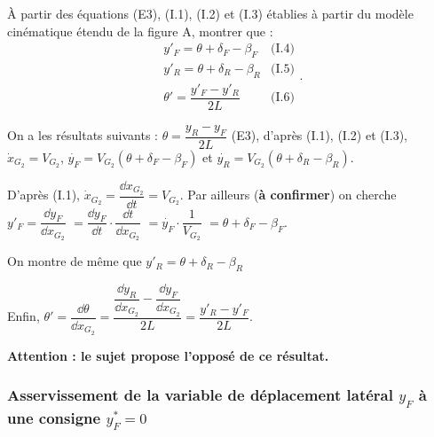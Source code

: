 \documentclass[11pt]{article}
\begin{document}
\UPSTIpreambuleEpreuve	%




\UPSTIquestion À partir des équations (E3), (I.1), (I.2) et (I.3) établies à partir du modèle cinématique étendu de la
figure A, montrer que : 
$$ \begin{array}{lr}
y'_F = \theta + \delta_F-\beta_F   & \text{(I.4)} \\
y'_R = \theta + \delta_R-\beta_R  & \text{(I.5)}\\
\theta'=\dfrac{y'_F-y'_R}{2L}       & \text{(I.6)}
\end{array}.$$

\begin{UPSTIcorrige}


On a les résultats suivants :  $  \theta = \dfrac{ y_{R} - y_F}{2L }$ (E3), d'après  (I.1), (I.2) et (I.3), $\dot{x}_{G_2}=V_{G_2}$, $\dot{y_F}=V_{G_2}\left(\theta + \delta_F - \beta_F\right)$ et  $\dot{y_R}=V_{G_2}\left(\theta + \delta_R - \beta_R\right)$. 


D'après (I.1), $\dot{x}_{G_2}= \dfrac{\dd x_{G_2}}{\dd t} =  V_{G_2}$.
Par ailleurs (\textbf{à confirmer}) on cherche $y'_F=\dfrac{\dd y_F}{\dd x_{G_2}} $ 
$= \dfrac{\dd y_F}{\dd t}  \cdot \dfrac{\dd  t}{\dd x_{G_2}}$ 
$ =\dot{y_F}\cdot \dfrac{1}{V_{G_2}}$ 
$ =\theta + \delta_F - \beta_F$.

On montre de même que $y'_R = \theta + \delta_R-\beta_R$

Enfin, $\theta' = \dfrac{\dd \theta}{\dd x_{G_2}}=\dfrac{ \dfrac{\dd y_{R}}{\dd x_{G_2}} - \dfrac{\dd y_F}{\dd x_{G_2}}}{2L } = \dfrac{y'_R-y'_F}{2L}$.

\textbf{Attention : le sujet propose l'opposé de ce résultat.}

\end{UPSTIcorrige}

\subsubsection{Asservissement de la variable de déplacement latéral $y_F$ à une consigne $y^*_F=0$}

\end{document}
